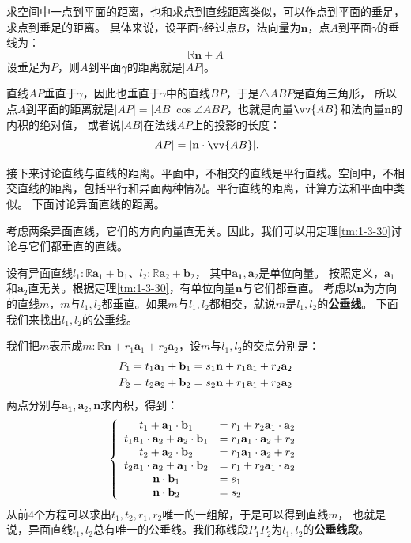 \documentclass[12pt,UTF8]{ctexbook}
\begin{document}
求空间中一点到平面的距离，也和求点到直线距离类似，可以作点到平面的垂足，求点到垂足的距离。
具体来说，设平面$\gamma$经过点$B$，法向量为$\mathbf{n}$，点$A$到平面$\gamma$的垂线为：
$$ \mathbb{R}\mathbf{n} + A$$
设垂足为$P$，则$A$到平面$\gamma$的距离就是$|AP|$。

直线$AP$垂直于$\gamma$，因此也垂直于$\gamma$中的直线$BP$，于是$\triangle ABP$是直角三角形，
所以点$A$到平面的距离就是$|AP| = |AB|\cos{\angle ABP}$，也就是向量$\vv{AB}$和法向量$\mathbf{n}$的内积的绝对值，
或者说$|AB|$在法线$AP$上的投影的长度：
$$ |AP| = |\mathbf{n}\cdot \vv{AB}|. $$

接下来讨论直线与直线的距离。平面中，不相交的直线是平行直线。空间中，不相交直线的距离，包括平行和异面两种情况。平行直线的距离，计算方法和平面中类似。
下面讨论异面直线的距离。

考虑两条异面直线，它们的方向向量直无关。因此，我们可以用定理\ref{tm:1-3-30}讨论与它们都垂直的直线。

设有异面直线$l_1:\mathbb{R}\mathbf{a}_1 + \mathbf{b}_1$、$l_2:\mathbb{R}\mathbf{a}_2 + \mathbf{b}_2$，
其中$\mathbf{a_1}, \mathbf{a}_2$是单位向量。
按照定义，$\mathbf{a}_1$和$\mathbf{a}_2$直无关。根据定理\ref{tm:1-3-30}，有单位向量$\mathbf{n}$与它们都垂直。
考虑以$\mathbf{n}$为方向的直线$m$，$m$与$l_1,l_2$都垂直。如果$m$与$l_1,l_2$都相交，就说$m$是$l_1,l_2$的\textbf{公垂线}。
下面我们来找出$l_1,l_2$的公垂线。

我们把$m$表示成$m: \mathbb{R}\mathbf{n} + r_1\mathbf{a}_1 + r_2\mathbf{a}_2$，设$m$与$l_1,l_2$的交点分别是：
\begin{align}
    P_1 = t_1\mathbf{a}_1 + \mathbf{b}_1 &= s_1\mathbf{n} + r_1\mathbf{a}_1 + r_2\mathbf{a}_2 \notag \\
    P_2 = t_2\mathbf{a}_2 + \mathbf{b}_2 &= s_2\mathbf{n} + r_1\mathbf{a}_1 + r_2\mathbf{a}_2  \notag
\end{align}
两点分别与$\mathbf{a_1}, \mathbf{a}_2,\mathbf{n}$求内积，得到：
$$
\left\{
\begin{array}[]{cl}
    t_1 + \mathbf{a}_1\cdot\mathbf{b}_1 &= r_1 + r_2\mathbf{a}_1\cdot\mathbf{a}_2 \\
    t_1\mathbf{a}_1\cdot\mathbf{a}_2 + \mathbf{a}_2\cdot\mathbf{b}_1 &= r_1\mathbf{a}_1\cdot\mathbf{a}_2 + r_2 \\
    t_2 + \mathbf{a}_2\cdot\mathbf{b}_2 &= r_1\mathbf{a}_1\cdot\mathbf{a}_2 + r_2 \\
    t_2\mathbf{a}_1\cdot\mathbf{a}_2 + \mathbf{a}_1\cdot\mathbf{b}_2 &= r_1 + r_2\mathbf{a}_1\cdot\mathbf{a}_2 \\
    \mathbf{n}\cdot\mathbf{b}_1 &= s_1 \\
    \mathbf{n}\cdot\mathbf{b}_2 &= s_2
\end{array}
\right.
$$
从前$4$个方程可以求出$t_1,t_2,r_1,r_2$唯一的一组解，于是可以得到直线$m$，
也就是说，异面直线$l_1,l_2$总有唯一的公垂线。我们称线段$P_1P_2$为$l_1,l_2$的\textbf{公垂线段}。
\end{document}
